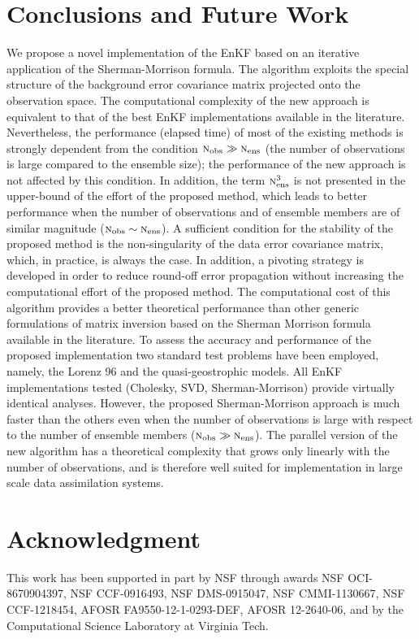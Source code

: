 \documentclass[12pt]{article}
\newcommand{\Nobs}{\textsc{n}_{{\rm obs}}}
\newcommand{\Nens}{\textsc{n}_{{\rm ens}}}
\begin{document}
\section{Conclusions and Future Work}\label{sec:conclusions}


We propose a novel implementation of the EnKF based on an iterative application of the Sherman-Morrison formula. The algorithm exploits the special structure of the background error covariance matrix projected onto the observation space. The computational complexity of the new approach is equivalent to that of the best EnKF implementations  available in the literature. Nevertheless, the performance (elapsed time) of most of the existing methods is strongly dependent from the condition $\Nobs \gg \Nens$ (the number of observations is large compared to the ensemble size); the performance of the new approach is not affected by this condition. In addition, the term $\Nens^3$ is not presented in the upper-bound of the effort of the proposed method, which leads to better performance when the number of observations and of ensemble members are of similar magnitude ($\Nobs \sim \Nens$). A sufficient condition for the stability of the proposed method is the non-singularity of the data error covariance matrix, which, in practice, is always the case. In addition, a pivoting strategy is developed in order to reduce round-off error propagation without increasing the computational effort of the proposed method. The computational cost of this algorithm provides a better theoretical performance than other generic formulations of matrix inversion based on the Sherman Morrison formula available in the literature. To assess the accuracy and performance of the proposed implementation two standard test problems have been employed, namely, the Lorenz 96 and the quasi-geostrophic models. All EnKF implementations tested (Cholesky, SVD, Sherman-Morrison) provide virtually identical analyses. However, the proposed Sherman-Morrison approach is much faster than the others even when the number of observations is large with respect to the number of ensemble members ($\Nobs \gg \Nens$). The parallel version of the new algorithm has a theoretical complexity that grows only linearly with the number of observations, and is therefore well suited for implementation in large scale data assimilation systems.


\section*{Acknowledgment}
This work has been supported in part by NSF through awards NSF OCI-8670904397, NSF CCF-0916493, NSF DMS-0915047, NSF CMMI-1130667, NSF CCF-1218454, AFOSR FA9550-12-1-0293-DEF, AFOSR 12-2640-06, and by the Computational Science Laboratory at Virginia Tech.
\end{document}
